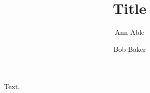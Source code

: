 \documentclass{article}
\title{Title}
\author[1]{Ann Able}
\author[1]{Bob Baker}
\affil[1]{One University}
\begin{document}
\maketitle
Text.
\end{document}
